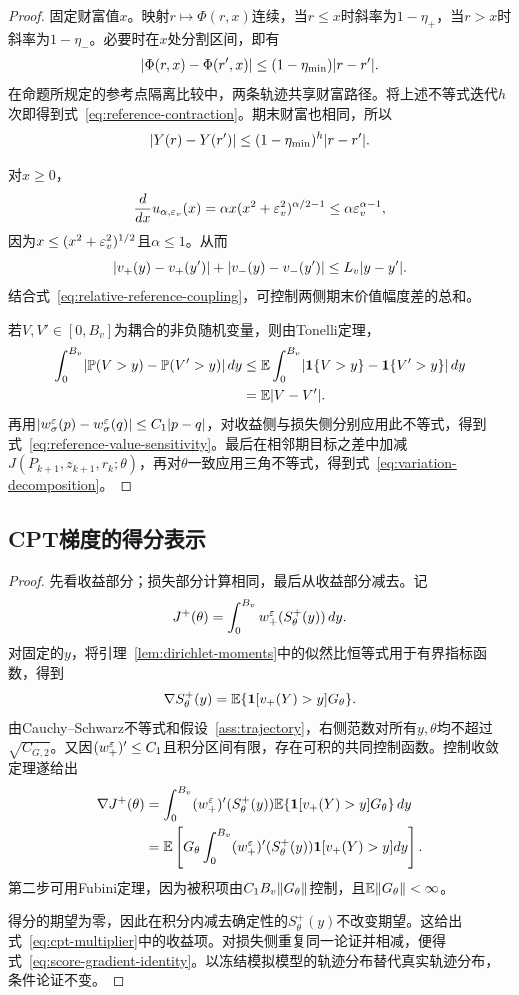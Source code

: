 \begin{proof}
固定财富值$x$。映射$r\mapsto\Phi(r,x)$连续，当$r\le x$时斜率为$1-\eta_+$，当$r>x$时斜率为$1-\eta_-$。必要时在$x$处分割区间，即有
\[
 \lvert\Phi(r,x)-\Phi(r',x)\rvert
 \le(1-\eta_{\min})\lvert r-r'\rvert.
\]
在命题所规定的参考点隔离比较中，两条轨迹共享财富路径。将上述不等式迭代$h$次即得到式~\eqref{eq:reference-contraction}。期末财富也相同，所以
\begin{equation}\label{eq:relative-reference-coupling}
 \lvert Y(r)-Y(r')\rvert
 \le(1-\eta_{\min})^h\lvert r-r'\rvert.
\end{equation}

对$x\ge0$，
\[
 \frac{d}{dx}u_{\alpha,\varepsilon_v}(x)
 =\alpha x(x^2+\varepsilon_v^2)^{\alpha/2-1}
 \le\alpha\varepsilon_v^{\alpha-1},
\]
因为$x\le(x^2+\varepsilon_v^2)^{1/2}$且$\alpha\le1$。从而
\[
 \lvert v_+(y)-v_+(y')\rvert
 +\lvert v_-(y)-v_-(y')\rvert
 \le L_v\lvert y-y'\rvert.
\]
结合式~\eqref{eq:relative-reference-coupling}，可控制两侧期末价值幅度差的总和。

若$V,V'\in[0,B_v]$为耦合的非负随机变量，则由Tonelli定理，
\begin{align*}
 \int_0^{B_v}\lvert\mathbb P(V>y)-\mathbb P(V'>y)\rvert\,dy
 &\le \mathbb E\int_0^{B_v}
 \lvert\mathbf 1\{V>y\}-\mathbf 1\{V'>y\}\rvert\,dy\\
 &=\mathbb E\lvert V-V'\rvert.
\end{align*}
再用$\lvert w_\sigma^\varepsilon(p)-w_\sigma^\varepsilon(q)\rvert\le C_1\lvert p-q\rvert$，对收益侧与损失侧分别应用此不等式，得到式~\eqref{eq:reference-value-sensitivity}。最后在相邻期目标之差中加减$J(P_{k+1},z_{k+1},r_k;\theta)$，再对$\theta$一致应用三角不等式，得到式~\eqref{eq:variation-decomposition}。
\end{proof}

\subsection{CPT梯度的得分表示}

\begin{proof}
先看收益部分；损失部分计算相同，最后从收益部分减去。记
\[
 J^+(\theta)=\int_0^{B_v}w_+^\varepsilon(S_\theta^+(y))\,dy.
\]
对固定的$y$，将引理~\ref{lem:dirichlet-moments}中的似然比恒等式用于有界指标函数，得到
\begin{equation}\label{eq:survival-score-derivative}
 \nabla S_\theta^+(y)
 =\mathbb E\{\mathbf 1[v_+(Y)>y]G_\theta\}.
\end{equation}
由Cauchy--Schwarz不等式和假设~\ref{ass:trajectory}，右侧范数对所有$y,\theta$均不超过$\sqrt{C_{G,2}}$。又因$(w_+^\varepsilon)'\le C_1$且积分区间有限，存在可积的共同控制函数。控制收敛定理遂给出
\begin{align*}
 \nabla J^+(\theta)
 &=\int_0^{B_v}(w_+^\varepsilon)'(S_\theta^+(y))
 \mathbb E\{\mathbf 1[v_+(Y)>y]G_\theta\}\,dy\\
 &=\mathbb E\left[G_\theta
 \int_0^{B_v}(w_+^\varepsilon)'(S_\theta^+(y))\mathbf 1[v_+(Y)>y]dy\right].
\end{align*}
第二步可用Fubini定理，因为被积项由$C_1B_v\lVert G_\theta\rVert$控制，且$\mathbb E\lVert G_\theta\rVert<\infty$。

得分的期望为零，因此在积分内减去确定性的$S_\theta^+(y)$不改变期望。这给出式~\eqref{eq:cpt-multiplier}中的收益项。对损失侧重复同一论证并相减，便得式~\eqref{eq:score-gradient-identity}。以冻结模拟模型的轨迹分布替代真实轨迹分布，条件论证不变。
\end{proof}
